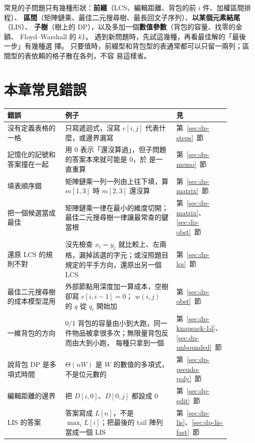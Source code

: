 常見的子問題只有幾種形狀：\textbf{前綴}（LCS、編輯距離、背包的前 $i$ 件、加權區間排程）、
\textbf{區間}（矩陣鏈乘、最佳二元搜尋樹、最長回文子序列）、\textbf{以某個元素結尾}（LIS）、
\textbf{子樹}（樹上的 DP），以及多加一個\textbf{數值參數}（背包的容量、找零的金額、
Floyd--Warshall 的 $k$）。 遇到新問題時，先試這幾種，再看最佳解的「最後一步」有幾種選
擇。 只要值時，前綴型和背包型的表通常都可以只留一兩列；區間型的表依賴的格子散在各列，不容
易這樣省。

\section{本章常見錯誤}
\label{sec:dp-pitfalls}

\begin{longtable}{p{0.25\linewidth}p{0.48\linewidth}>{\raggedright\arraybackslash}p{0.17\linewidth}}
\toprule
錯誤 & 例子 & 見 \\
\midrule
\endhead
沒有定義表格的一格 & 只寫遞迴式，沒寫 $c[i, j]$ 代表什麼，或邊界漏寫 &
第~\ref{sec:dp-steps}~節 \\
記憶化的記號和答案撞在一起 & 用 $0$ 表示「還沒算過」，但子問題的答案本來就可能是 $0$，於
是一直重算 & 第~\ref{sec:dp-memo}~節 \\
填表順序錯 & 矩陣鏈乘一列一列由上往下填，算 $m[1, 3]$ 時 $m[2, 3]$ 還沒算 &
第~\ref{sec:dp-matrix}~節 \\
把一個候選當成最佳 & 矩陣鏈乘一律在最小的維度切開；最佳二元搜尋樹一律讓最常查的鍵當根 &
第~\ref{sec:dp-matrix}、\ref{sec:dp-obst}~節 \\
還原 LCS 的規則不對 & 沒先檢查 $x_i = y_j$ 就比較上、左兩格，漏掉該選的字元；或沒照題目規定的平手方向，還原出另一個 LCS &
第~\ref{sec:dp-lcs}~節 \\
最佳二元搜尋樹的成本模型混用 & 外部節點用深度加一算成本，空樹卻寫 $e[i, i-1] = 0$；
$w(i, j)$ 的 $q$ 從 $q_i$ 開始加 & 第~\ref{sec:dp-obst}~節 \\
一維背包的方向 & 0/1 背包的容量由小到大跑，同一件物品被拿很多次；無限量背包反而由大到小跑，
每種只拿到一個 & 第~\ref{sec:dp-knapsack-1d}、\ref{sec:dp-unbounded}~節 \\
說背包 DP 是多項式時間 & $\Theta(nW)$ 是 $W$ 的數值的多項式，不是位元數的 &
第~\ref{sec:dp-pseudo-poly}~節 \\
編輯距離的邊界 & 把 $D[i, 0]$、$D[0, j]$ 都設成 $0$ & 第~\ref{sec:dp-edit}~節 \\
LIS 的答案 & 答案寫成 $L[n]$，不是 $\max_i L[i]$；把最後的 tail 陣列當成一個 LIS &
第~\ref{sec:dp-lis}、\ref{sec:dp-lis-fast}~節 \\

\end{longtable}
